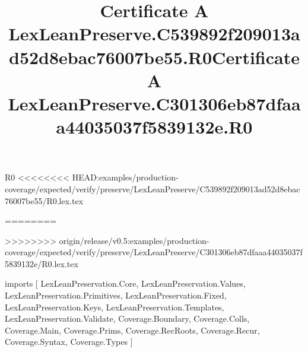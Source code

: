 \begin{lexlean}{R0}
<<<<<<<< HEAD:examples/production-coverage/expected/verify/preserve/LexLeanPreserve/C539892f209013ad52d8ebac76007be55/R0.lex.tex
\title{Certificate A LexLeanPreserve.C539892f209013ad52d8ebac76007be55.R0}
========
\title{Certificate A LexLeanPreserve.C301306eb87dfaaa44035037f5839132e.R0}
>>>>>>>> origin/release/v0.5:examples/production-coverage/expected/verify/preserve/LexLeanPreserve/C301306eb87dfaaa44035037f5839132e/R0.lex.tex
\begin{coremodule}
imports [
  LexLeanPreservation.Core,
  LexLeanPreservation.Values,
  LexLeanPreservation.Primitives,
  LexLeanPreservation.Fixed,
  LexLeanPreservation.Keys,
  LexLeanPreservation.Templates,
  LexLeanPreservation.Validate,
  Coverage.Boundary,
  Coverage.Colls,
  Coverage.Main,
  Coverage.Prims,
  Coverage.RecRoots,
  Coverage.Recur,
  Coverage.Syntax,
  Coverage.Types
]


\end{coremodule}
\end{lexlean}
